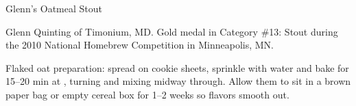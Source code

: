\documentclass[parskip=half,fontsize=9pt,oneside]{scrbook}
\begin{document}
\mainmatter


\begin{recipe}{Glenn's Oatmeal Stout}

\begin{aboutblock}
Glenn Quinting of Timonium, MD. Gold medal in Category \#13: Stout during the
2010 National Homebrew Competition in Minneapolis, MN. \sourceaha
\end{aboutblock}


\begin{methodandtiming}

\begin{mashsteps}
\end{mashsteps}

\begin{fermentationsteps}
\end{fermentationsteps}

\begin{directions}
Flaked oat preparation: spread on cookie sheets, sprinkle with water and bake for 15--20
min at , turning and mixing midway through. Allow them to sit in a brown paper bag
or empty cereal box for 1--2 weeks so flavors smooth out. 
\end{directions}

\end{methodandtiming}

\recipebreak

\begin{ingredientsblock}

\begin{malts}
\end{malts}

\begin{hops}
\end{hops}


\end{ingredientsblock}

\end{recipe}


\end{document}
